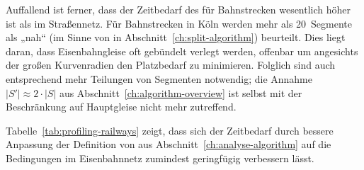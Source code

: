 \documentclass[../main/thesis.tex]{subfiles}
\begin{document}
Auffallend ist ferner, dass der Zeitbedarf des  für Bahnstrecken wesentlich höher ist als im Straßennetz.
Für Bahnstrecken in Köln werden mehr als 20~Segmente als „nah“ (im Sinne von  in Abschnitt~\ref{ch:split-algorithm}) beurteilt.
Dies liegt daran, dass Eisenbahngleise oft gebündelt verlegt werden, offenbar um angesichts der großen Kurvenradien den Platzbedarf zu minimieren.
Folglich sind auch entsprechend mehr Teilungen von Segmenten notwendig;
die Annahme $|S'| \approx 2 \cdot |S|$ aus Abschnitt~\ref{ch:algorithm-overview} ist selbst mit der Beschränkung auf Hauptgleise nicht mehr zutreffend.

Tabelle~\ref{tab:profiling-railways} zeigt, dass sich der Zeitbedarf durch bessere Anpassung der Definition von  aus Abschnitt~\ref{ch:analyse-algorithm} auf die Bedingungen im Eisenbahnnetz zumindest geringfügig verbessern lässt.







\onlyinsubfile{\listoffigures}
\onlyinsubfile{\listoftables}
\end{document}
